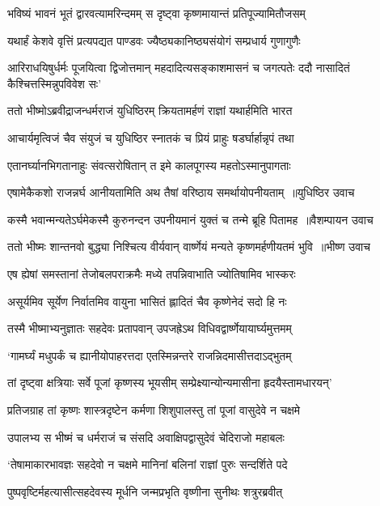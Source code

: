 \twolineshloka
{भविष्यं भावनं भूतं द्वारवत्यामरिन्दमम्}
{स दृष्ट्वा कृष्णमायान्तं प्रतिपूज्यामितौजसम्}


\twolineshloka
{यथार्हं केशवे वृत्तिं प्रत्यपद्यत पाण्डवः}
{ज्यैष्ठ्यकानिष्ठ्यसंयोगं सम्प्रधार्य गुणागुणैः}


\threelineshloka
{आरिराधयिषुर्धर्मः पूजयित्वा द्विजोत्तमान्}
{महदादित्यसङ्काशमासनं च जगत्पतेः}
{ददौ नासादितं कैश्चित्तस्मिन्नुपविवेश सः'}


\twolineshloka
{ततो भीष्मोऽब्रवीद्राजन्धर्मराजं युधिष्ठिरम्}
{क्रियतामर्हणं राज्ञां यथार्हमिति भारत}


\twolineshloka
{आचार्यमृत्विजं चैव संयुजं च युधिष्ठिर}
{स्नातकं च प्रियं प्राहुः षडर्घार्हान्नृपं तथा}


\twolineshloka
{एतानर्घ्यानभिगतानाहुः संवत्सरोषितान्}
{त इमे कालपूगस्य महतोऽस्मानुपागताः}


\twolineshloka
{एषामेकैकशो राजन्नर्घ आनीयतामिति}
{अथ तैषां वरिष्ठाय समर्थायोपनीयताम् ॥युधिष्ठिर उवाच}


\twolineshloka
{कस्मै भवान्मन्यतेऽर्घमेकस्मै कुरुनन्दन}
{उपनीयमानं युक्तं च तन्मे ब्रूहि पितामह ॥वैशम्पायन उवाच}


\twolineshloka
{ततो भीष्मः शान्तनवो बुद्ध्या निश्चित्य वीर्यवान्}
{वार्ष्णेयं मन्यते कृष्णमर्हणीयतमं भुवि ॥भीष्ण उवाच}


\twolineshloka
{एष ह्येषां समस्तानां तेजोबलपराक्रमैः}
{मध्ये तपन्निवाभाति ज्योतिषामिव भास्करः}


\twolineshloka
{असूर्यमिव सूर्येण निर्वातमिव वायुना}
{भासितं ह्लादितं चैव कृष्णेनेदं सदो हि नः}


\twolineshloka
{तस्मै भीष्माभ्यनुज्ञातः सहदेवः प्रतापवान्}
{उपजह्रेऽथ विधिवद्वार्ष्णेयायार्घ्यमुत्तमम्}


\twolineshloka
{`गामर्घ्यं मधुपर्कं च ह्यानीयोपाहरत्तदा}
{एतस्मिन्नन्तरे राजन्निदमासीत्तदाऽद्भुतम्}


\twolineshloka
{तां दृष्ट्वा क्षत्रियाः सर्वे पूजां कृष्णस्य भूयसीम्}
{सम्प्रेक्ष्यान्योन्यमासीना हृदयैस्तामधारयन्'}


\twolineshloka
{प्रतिजग्राह तां कृष्णः शास्त्रदृष्टेन कर्मणा}
{शिशुपालस्तु तां पूजां वासुदेवे न चक्षमे}


\twolineshloka
{उपालभ्य स भीष्मं च धर्मराजं च संसदि}
{अवाक्षिपद्वासुदेवं चेदिराजो महाबलः}


\twolineshloka
{`तेषामाकारभावज्ञः सहदेवो न चक्षमे}
{मानिनां बलिनां राज्ञां पुरुः सन्दर्शिते पदे}


\twolineshloka
{पुष्पवृष्टिर्महत्यासीत्सहदेवस्य मूर्धनि}
{जन्मप्रभृति वृष्णीना सुनीथः शत्रुरब्रवीत्}



